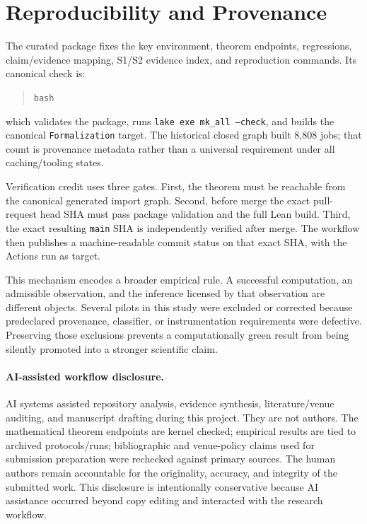 \documentclass[sigplan,10pt,anonymous,review]{acmart}
\newcommand{\code}[1]{\texttt{#1}}
\newcommand{\tpath}[1]{\path{#1}}
\begin{document}
\section{Reproducibility and Provenance}
The curated package fixes the key environment, theorem endpoints, regressions, claim/evidence mapping, S1/S2 evidence index, and reproduction commands. Its canonical check is:
\begin{quote}
\small\texttt{bash }
\end{quote}
which validates the package, runs \code{lake exe mk\_all --check}, and builds the canonical \code{Formalization} target. The historical closed graph built 8,808 jobs; that count is provenance metadata rather than a universal requirement under all caching/tooling states.

Verification credit uses three gates. First, the theorem must be reachable from the canonical generated import graph. Second, before merge the exact pull-request head SHA must pass package validation and the full Lean build. Third, the exact resulting \code{main} SHA is independently verified after merge. The workflow then publishes a machine-readable commit status
\tpath{erdos678/post-merge-verification}
on that exact SHA, with the Actions run as target.

This mechanism encodes a broader empirical rule. A successful computation, an admissible observation, and the inference licensed by that observation are different objects. Several pilots in this study were excluded or corrected because predeclared provenance, classifier, or instrumentation requirements were defective. Preserving those exclusions prevents a computationally green result from being silently promoted into a stronger scientific claim.

\paragraph{AI-assisted workflow disclosure.}
AI systems assisted repository analysis, evidence synthesis, literature/venue auditing, and manuscript drafting during this project. They are not authors. The mathematical theorem endpoints are kernel checked; empirical results are tied to archived protocols/runs; bibliographic and venue-policy claims used for submission preparation were rechecked against primary sources. The human authors remain accountable for the originality, accuracy, and integrity of the submitted work. This disclosure is intentionally conservative because AI assistance occurred beyond copy editing and interacted with the research workflow.
\end{document}
